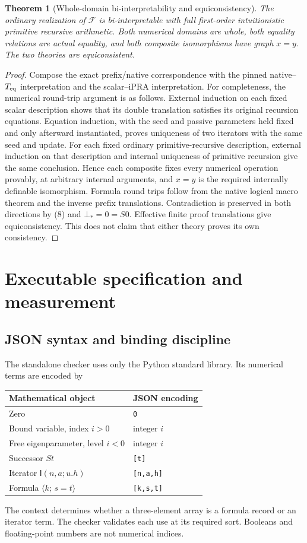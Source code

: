 \documentclass[11pt]{article}
\newtheorem{theorem}{Theorem}[section]
\theoremstyle{definition}\newtheorem{definition}[theorem]{Definition}
\theoremstyle{remark}\newtheorem{remark}[theorem]{Remark}
\newcommand{\I}{\mathsf I}
\newcommand{\F}{\mathcal F}
\newcommand{\Teq}{T_{\rm eq}}
\newcommand{\Eq}[3]{\langle #1;\,#2=#3\rangle}
\newcommand{\code}[1]{\texttt{#1}}
\begin{document}
\begin{theorem}[Whole-domain bi-interpretability and equiconsistency]
The ordinary realization of $\F$ is bi-interpretable with full
first-order intuitionistic primitive recursive arithmetic. Both numerical
domains are whole, both equality relations are actual equality, and
both composite isomorphisms have graph $x=y$. The two theories are
equiconsistent.
\end{theorem}
\begin{proof}
Compose the exact prefix/native correspondence with the pinned
native--$\Teq$ interpretation and the scalar--iPRA interpretation.
For completeness, the numerical round-trip argument is as follows.
External induction on each fixed scalar description shows that its
double translation satisfies its original recursion equations. Equation
induction, with the seed and passive parameters held fixed and only
afterward instantiated, proves uniqueness of two iterators with the same
seed and update. For each fixed
ordinary primitive-recursive description, external induction on that
description and internal uniqueness of primitive recursion give the
same conclusion. Hence each composite fixes every numerical operation
provably, at arbitrary internal arguments, and $x=y$ is the required
internally definable isomorphism. Formula round trips follow from the
native logical macro theorem and the inverse prefix translations.
Contradiction is preserved in both directions by (8) and
$\bot_*=0=S0$. Effective finite proof translations give equiconsistency.
This does not claim that either theory proves its own consistency.
\end{proof}

\section{Executable specification and measurement}
\label{sec:measurements}

\subsection{JSON syntax and binding discipline}

The standalone checker uses only the Python standard library.
Its numerical terms are encoded by
\begin{center}
\begin{tabular}{ll}
\toprule
Mathematical object & JSON encoding\\
\midrule
Zero & \code{0}\\
Bound variable, index $i>0$ & integer $i$\\
Free eigenparameter, level $i<0$ & integer $i$\\
Successor $St$ & \code{[t]}\\
Iterator $\I(n,a;u.h)$ & \code{[n,a,h]}\\
Formula $\Eq{k}{s}{t}$ & \code{[k,s,t]}\\
\bottomrule
\end{tabular}
\end{center}
The context determines whether a three-element array is a formula record
or an iterator term. The checker validates each use at its required sort.
Booleans and floating-point numbers are not numerical indices.
\end{document}
